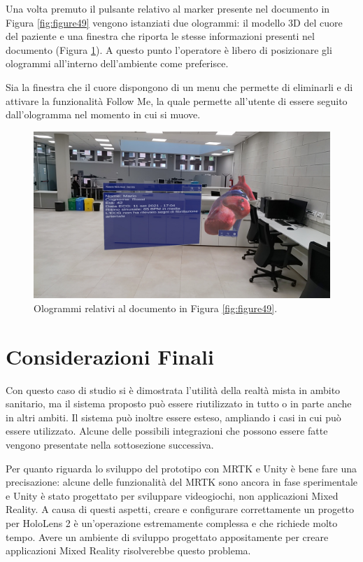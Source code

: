 Una volta premuto il pulsante relativo al marker presente nel documento in Figura \ref{fig:figure49} vengono istanziati due ologrammi: il modello 3D del cuore del paziente e una finestra che riporta le stesse informazioni presenti nel documento (Figura \ref{fig:figure411}).
A questo punto l'operatore è libero di posizionare gli ologrammi all'interno dell'ambiente come preferisce.

Sia la finestra che il cuore dispongono di un menu che permette di eliminarli e di attivare la funzionalità Follow Me, la quale permette all'utente di essere seguito dall'ologramma nel momento in cui si muove.

\begin{figure}[H]
    \centering
    \includegraphics[width=\textwidth]{images/ecg-hologram.jpg}
    \caption{Ologrammi relativi al documento in Figura \ref{fig:figure49}.}
    \label{fig:figure411}
\end{figure}

\section{Considerazioni Finali}\label{sec:sezione45}
Con questo caso di studio si è dimostrata l'utilità della realtà mista in ambito sanitario, ma il sistema proposto può essere riutilizzato in tutto o in parte anche in altri ambiti.
Il sistema può inoltre essere esteso, ampliando i casi in cui può essere utilizzato. Alcune delle possibili integrazioni che possono essere fatte vengono presentate nella sottosezione successiva.

Per quanto riguarda lo sviluppo del prototipo con MRTK e Unity è bene fare una precisazione: alcune delle funzionalità del MRTK sono ancora in fase sperimentale e Unity è stato progettato per sviluppare videogiochi, non applicazioni Mixed Reality.
A causa di questi aspetti, creare e configurare correttamente un progetto per HoloLens 2 è un'operazione estremamente complessa e che richiede molto tempo.
Avere un ambiente di sviluppo progettato appositamente per creare applicazioni Mixed Reality risolverebbe questo problema.

